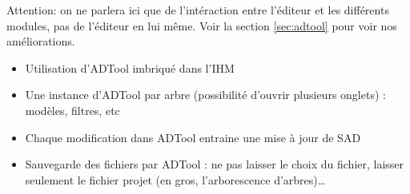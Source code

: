 		Attention: on ne parlera ici que de l'intéraction entre l'éditeur et les différents modules, pas de l'éditeur en lui même.
		Voir la section \ref{sec:adtool} pour voir nos améliorations.

		\begin{itemize}
			\item  Utilisation d'ADTool imbriqué dans l'IHM
			\item Une instance d'ADTool par arbre (possibilité d'ouvrir plusieurs onglets) : modèles, filtres, etc
			\item Chaque modification dans ADTool entraine une mise à jour de SAD
			\item Sauvegarde des fichiers par ADTool : ne pas laisser le choix du fichier, laisser seulement le fichier projet (en gros, l'arborescence d'arbres)\ldots
		\end{itemize}
